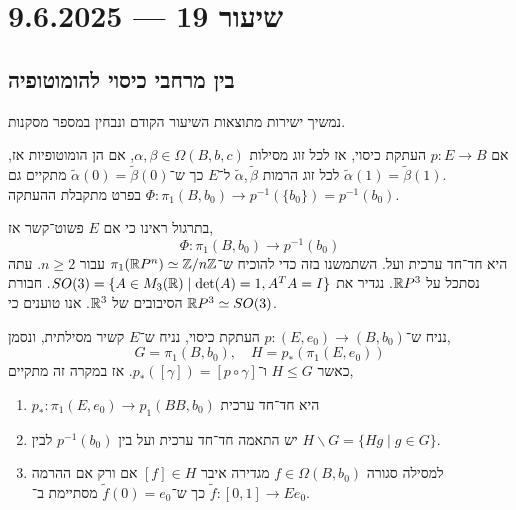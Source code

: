 \section{שיעור 19 --- 9.6.2025}

\subsection{בין מרחבי כיסוי להומוטופיה}
נמשיך ישירות מתוצאות השיעור הקודם ונבחין במספר מסקנות.
\begin{conclusion}
	אם $p : E \to B$ העתקת כיסוי,
	אז לכל זוג מסילות $\alpha, \beta \in \Omega(B, b, c)$, אם הן הומוטופיות אז,
	לכל זוג הרמות $\tilde{\alpha}, \tilde{\beta}$ ל־$E$ כך ש־$\tilde{\alpha}(0) = \tilde{\beta}(0)$ מתקיים גם $\tilde{\alpha}(1) = \tilde{\beta}(1)$. \\
	בפרט מתקבלת ההעתקה $\Phi : \pi_1(B, b_0) \to p^{-1}(\{ b_0 \}) = p^{-1}(b_0)$.
\end{conclusion}
בתרגול ראינו כי אם $E$ פשוט־קשר אז,
\[
	\Phi : \pi_1(B, b_0) \to p^{-1}(b_0)
\]
היא חד־חד ערכית ועל.
השתמשנו בזה כדי להוכיח ש־$\pi_1(\mathbb{R} P^n) \simeq \mathbb{Z} / n\mathbb{Z}$ עבור $n \ge 2$.
עתה נסתכל על $\mathbb{R} P^3$.
נגדיר את $SO(3) = \{ A \in M_3(\mathbb{R}) \mid \det(A) = 1, A^T A = I \}$.
חבורת הסיבובים של $\mathbb{R}^3$.
אנו טוענים כי $\mathbb{R} P^3 \simeq SO(3)$.
\begin{theorem}
	נניח ש־$p : (E, e_0) \to (B, b_0)$ העתקת כיסוי, נניח ש־$E$ קשיר מסילתית,
	ונסמן,
	\[
		G = \pi_1(B, b_0),
		\quad
		H = p_*(\pi_1(E, e_0))
	\]
	כאשר $H \le G$ ו־$p_*([\gamma]) = [ p \circ \gamma ]$.
	אז במקרה זה מתקיים,
	\begin{enumerate}
		\item $p_* : \pi_1(E, e_0) \to p_1(BB, b_0)$ היא חד־חד ערכית
		\item יש התאמה חד־חד ערכית ועל בין $p^{-1}(b_0)$ לבין $H \backslash G = \{ H g \mid g \in G \}$.
		\item למסילה סגורה $f \in \Omega(B, b_0)$ מגדירה איבר $[f] \in H$ אם ורק אם ההרמה $\tilde{f} : [0, 1] \to E$ כך ש־$\tilde{f}(0) = e_0$ מסתיימת ב־$e_0$.
	\end{enumerate}
\end{theorem}

